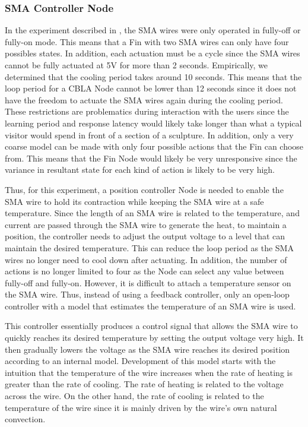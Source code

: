 \subsubsection{SMA Controller Node}

In the experiment described in , the SMA wires were only operated in fully-off or fully-on mode. This means that a Fin with two SMA wires can only have four possibles states. In addition, each actuation must be a cycle since the SMA wires cannot be fully actuated at 5V for more than 2 seconds. Empirically, we determined that the cooling period takes around 10 seconds. This means that the loop period for a CBLA Node cannot be lower than 12 seconds since it does not have the freedom to actuate the SMA wires again during the cooling period. These restrictions are problematics during interaction with the users since the learning period and response latency would likely take longer than what a typical visitor would spend in front of a section of a sculpture. In addition, only a very coarse model can be made with only four possible actions that the Fin can choose from. This means that the Fin Node would likely be very unresponsive since the variance in resultant state for each kind of action is likely to be very high.

Thus, for this experiment, a position controller Node is needed to enable the SMA wire to hold its contraction while keeping the SMA wire at a safe temperature. Since the length of an SMA wire is related to the temperature, and current are passed through the SMA wire to generate the heat, to maintain a position, the controller needs to adjust the output voltage to a level that can maintain the desired temperature. This can reduce the loop period as the SMA wires no longer need to cool down after actuating. In addition, the number of actions is no longer limited to four as the Node can select any value between fully-off and fully-on. However, it is difficult to attach a temperature sensor on the SMA wire. Thus, instead of using a feedback controller, only an open-loop controller with a model that estimates the temperature of an SMA wire is used.

This controller essentially produces a control signal that allows the SMA wire to quickly reaches its desired temperature by setting the output voltage very high. It then gradually lowers the voltage as the SMA wire reaches its desired position according to an internal model. Development of this model starts with the intuition that the temperature of the wire increases when the rate of heating is greater than the rate of cooling. The rate of heating is related to the voltage across the wire. On the other hand, the rate of cooling is related to the temperature of the wire since it is mainly driven by the wire's own natural convection. 

